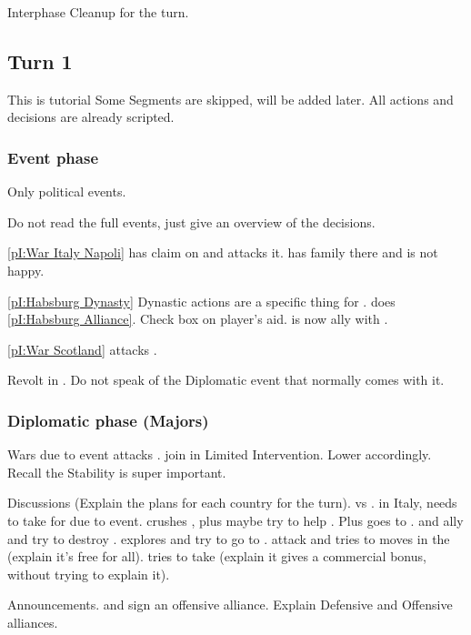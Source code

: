 \aparag Interphase
\bparag Cleanup for the turn.

\subsection{Turn 1}
\aparag This is tutorial
\bparag Some Segments are skipped, will be added later.
\bparag All actions and decisions are already scripted.

\subsubsection{Event phase}
\aparag Only political events.

\aparag Do not read the full events, just give an overview of the decisions.

\aparag \ref{pI:War Italy Napoli}
\bparag \FRA has claim on  and attacks it. \HIS has family there
and is not happy.

\aparag \ref{pI:Habsburg Dynasty}
\bparag Dynastic actions are a specific thing for \HIS.
\bparag \HIS does \ref{pI:Habsburg Alliance}. Check box on player's aid.
\bparag \HIS is now ally with \paysHabsbourg.

\aparag \ref{pI:War Scotland}
\bparag \paysEcosse attacks \ANG.

\aparag Revolt
\bparag \REVOLT\facemoins in \provinceCatalogne.
\bparag Do not speak of the Diplomatic event that normally comes with it.

\subsubsection{Diplomatic phase (Majors)}
\aparag Wars due to event
\bparag \FRA attacks \paysNaples. \HIS join in Limited Intervention.
\bparag Lower \STAB accordingly. Recall the Stability is super important.

\aparag Discussions (Explain the plans for each country for the turn).
\bparag \ANG vs \paysEcosse.
\bparag \FRA in Italy, needs to take \villeNaples for \VPs due to event.
\bparag \HIS crushes \REVOLT, plus maybe try to help \paysNaples. Plus goes to
\continentAmerica.
\bparag \POL and \RUS ally and try to destroy \paysDon.
\bparag \POR explores and try to go to \continentIndia.
\bparag \TUR attack \paysGeorgie and tries to moves in the \regionBalkans
(explain it's free for all).
\bparag \VEN tries to take \villeRagusa (explain it gives a commercial bonus,
without trying to explain it).

\aparag Announcements.
\bparag \RUS and \POL sign an offensive alliance.
\bparag Explain Defensive and Offensive alliances.

